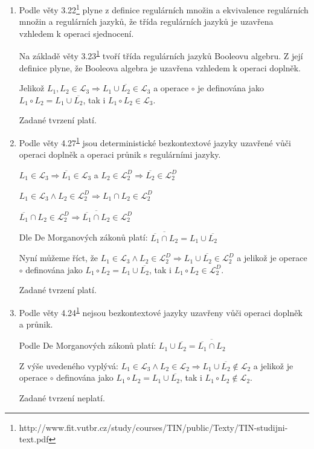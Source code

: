\documentclass[11pt, a4paper, titlepage]{article}
\begin{document}
\begin{enumerate}[label=\alph*)]

    \item
    Podle věty 3.22\footnote{\label{opora}http://www.fit.vutbr.cz/study/courses/TIN/public/Texty/TIN-studijni-text.pdf} plyne z definice regulárních množin a ekvivalence regulárních množin a regulárních jazyků, že třída regulárních jazyků je uzavřena vzhledem k operaci sjednocení.

    Na základě věty 3.23\textsuperscript{\ref{opora}} tvoří třída regulárních jazyků Booleovu algebru. Z její definice plyne, že Booleova algebra je uzavřena vzhledem k operaci doplněk.

    Jelikož $L_1, L_2 \in \mathcal{L}_3 \Rightarrow L_1 \cup \overline{L_2} \in \mathcal{L}_3$ a operace $\circ$ je definována jako $L_1 \circ L_2 = L_1 \cup \overline{L_2}$, tak i $L_1 \circ L_2 \in \mathcal{L}_3$.

    Zadané tvrzení platí.


    \item
    Podle věty 4.27\textsuperscript{\ref{opora}} jsou deterministické bezkontextové jazyky uzavřené vůči operaci doplněk a operaci průnik s regulárními jazyky.

    $L_1 \in \mathcal{L}_3 \Rightarrow \overline{L_1} \in \mathcal{L}_3$ a $L_2 \in \mathcal{L}_2^D \Rightarrow \overline{L_2} \in \mathcal{L}_2^D$

    $L_1 \in \mathcal{L}_3 \land L_2 \in \mathcal{L}_2^D \Rightarrow L_1 \cap L_2 \in \mathcal{L}_2^D$

    $\overline{L_1} \cap L_2 \in \mathcal{L}_2^D \Rightarrow \overline{\overline{L_1} \cap L_2} \in \mathcal{L}_2^D$

    Dle De Morganových zákonů platí: $\overline{\overline{L_1} \cap L_2} = L_1 \cup \overline{L_2}$

    Nyní můžeme říct, že $L_1 \in \mathcal{L}_3 \land L_2 \in \mathcal{L}_2^D \Rightarrow L_1 \cup \overline{L_2} \in \mathcal{L}_2^D$ a jelikož je operace $\circ$ definována jako $L_1 \circ L_2 = L_1 \cup \overline{L_2}$, tak i $L_1 \circ L_2 \in \mathcal{L}_2^D$.

    Zadané tvrzení platí.


    \item
    Podle věty 4.24\textsuperscript{\ref{opora}} nejsou bezkontextové jazyky uzavřeny vůči operaci doplněk a průnik.

    Podle De Morganových zákonů platí: $L_1 \cup \overline{L_2} = \overline{\overline{L_1} \cap L_2}$

    Z výše uvedeného vyplývá: $L_1 \in \mathcal{L}_3 \land L_2 \in \mathcal{L}_2 \Rightarrow L_1 \cup \overline{L_2} \notin \mathcal{L}_2$ a jelikož je operace $\circ$ definována jako $L_1 \circ L_2 = L_1 \cup \overline{L_2}$, tak i $L_1 \circ L_2 \notin \mathcal{L}_2$.

    Zadané tvrzení neplatí.

\end{enumerate}
\end{document}
